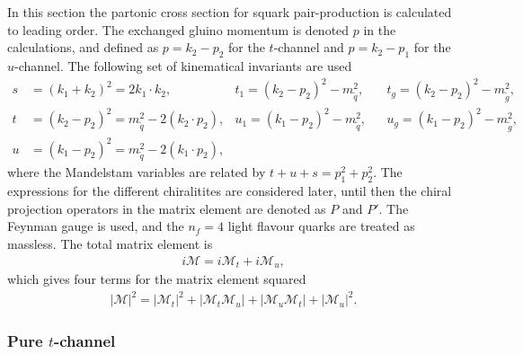 \documentclass[twoside,english]{uiofysmaster}
\begin{document}
{In this section the partonic cross section for squark pair-production is calculated to leading order. The exchanged gluino momentum is denoted $p$ in the calculations, and defined as $p= k_2-p_2 $ for the $t$-channel and $p=k_2-p_1$ for the $u$-channel. The following set of kinematical invariants are used
\begin{align*}
s &= (k_1 + k_2)^2 = 2 k_1 \cdot k_2, &t_1 = (k_2-p_2)^2 - m_{\widetilde{q}}^2, &&t_g = (k_2-p_2)^2 - m_{\widetilde{g}}^2,\\
t &= (k_2-p_2)^2 = m_{\widetilde{q}}^2 - 2 (k_2 \cdot p_2), &u_1 = (k_1-p_2)^2 - m_{\widetilde{q}}^2, &&u_g = (k_1-p_2)^2 - m_{\widetilde{g}}^2,\\
u &= (k_1 - p_2)^2 = m_{\widetilde{q}}^2 - 2 (k_1 \cdot p_2),
\end{align*}
where the Mandelstam variables are related by $t + u+ s = p_1^2 + p_2^2$. The expressions for the different chiralitites are considered later, until then the chiral projection operators in the matrix element are denoted as $P$ and $P'$. The Feynman gauge is used, and the $n_f = 4$ light flavour quarks are treated as massless. The total matrix element is
\begin{align}\label{Eq:: susy hadron : matrix element}
i\mathcal{M} = i\mathcal{M}_t + i\mathcal{M}_u,
\end{align}
which gives four terms for the matrix element squared
\begin{align}\label{Eq:: susy hadron : matrix element squared}
|\mathcal{M}|^2 = |\mathcal{M}_t|^2 + |\mathcal{M}_t \mathcal{M}_u| + |\mathcal{M}_u \mathcal{M}_t| + |\mathcal{M}_u|^2.
\end{align}

\subsubsection{Pure $t$-channel}

}
\end{document}
